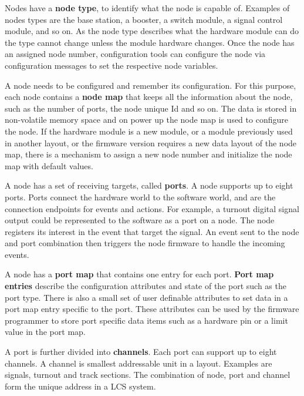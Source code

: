 Nodes have a {\bf node type}, to identify what the node is capable of. Examples of nodes types are the base station, a booster, a switch module, a signal control module, and so on. As the node type describes what the hardware module can do the type cannot change unless the module hardware changes. Once the node has an assigned node number, configuration tools can configure the node via configuration messages to set the respective node variables.

A node needs to be configured and remember its configuration. For this purpose, each node contains a {\bf node map} that keeps all the information about the node, such as the number of ports, the node unique Id and so on. The data is stored in non-volatile memory space and on power up the node map is used to configure the node. If the hardware module is a new module, or a module previously used in another layout, or the firmware version requires a new data layout of the node map, there is a mechanism to assign a new node number and initialize the node map with default values.


A node has a set of receiving targets, called \textbf{ports}. A node supports up to eight ports. Ports connect the hardware world to the software world, and are the connection endpoints for events and actions. For example, a turnout digital signal output could be represented to the software as a port on a node. The node registers its interest in the event that target the signal. An event sent to the node and port combination then triggers the node firmware to handle the incoming events. 

A node has a {\bf port map} that contains one entry for each port. {\bf Port map entries} describe the configuration attributes and state of the port such as the port type. There is also a small set of user definable attributes to set data in a port map entry specific to the port. These attributes can be used by the firmware programmer to store port specific data items such as a hardware pin or a limit value in the port map.


A port is further divided into \textbf{channels}. Each port can support up to eight channels. A channel is smallest addressable unit in a layout. Examples are signals, turnout and track sections. The combination of node, port and channel form the unique address in a LCS system.

\begin{center}
\end{center}

